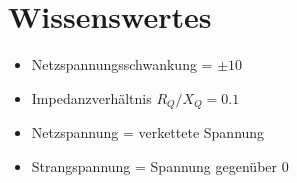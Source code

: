 \section{Wissenswertes}
\begin{itemize}
	\itemsep0.5em
	\item Netzspannungsschwankung = $\pm 10 $
	\item Impedanzverhältnis $R_{Q}/X_{Q}=0.1$
	\item Netzspannung = verkettete Spannung
	\item Strangspannung = Spannung gegenüber 0
\end{itemize}